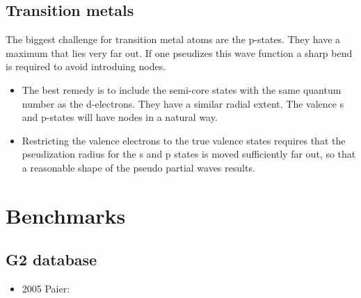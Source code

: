 \documentclass[11pt,a4paper]{report}
\begin{document}
\subsection{Transition metals}
The biggest challenge for transition metal atoms are the
p-states. They have a maximum that lies very far out. If one pseudizes
this wave function a sharp bend is required to avoid introduing nodes.
\begin{itemize}
\item The best remedy is to include the semi-core states with the same
  quantum number as the d-electrons. They have a similar radial
  extent. The valence s and p-states will have nodes in a natural way.
%
\item Restricting the valence electrons to the true valence states
  requires that the pseudization radius for the s and p states is
  moved sufficiently far out, so that a reasonable shape of the pseudo
  partial waves results.
\end{itemize}

\section{Benchmarks}
\subsection{G2 database}


\begin{itemize}
\item 2005 Paier\cite{paier05_jcp122_234102}: 
\end{itemize}
\end{document}
